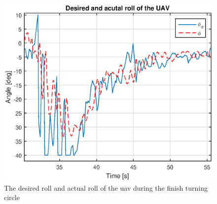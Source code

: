 \begin{figure}[H]
\centering
\includegraphics[scale=0.7]{figs/Experiment/rollDesired131844.eps}
\caption{The desired roll and actual roll of the \gls{uav} during the finish turning circle}
\label{Fig:DesiredRoll131844}
\end{figure}

